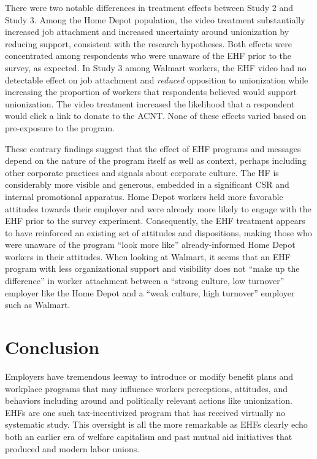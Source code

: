 \documentclass[
  11pt,
  oneside]{article}
\begin{document}
There were two notable differences in treatment effects between Study 2 and Study 3. Among the Home Depot population, the video treatment substantially increased job attachment and increased uncertainty around unionization by reducing support, consistent with the research hypotheses. Both effects were concentrated among respondents who were unaware of the EHF prior to the survey, as expected. In Study 3 among Walmart workers, the EHF video had no detectable effect on job attachment and \emph{reduced} opposition to unionization while increasing the proportion of workers that respondents believed would support unionization. The video treatment increased the likelihood that a respondent would click a link to donate to the ACNT. None of these effects varied based on pre-exposure to the program.

These contrary findings suggest that the effect of EHF programs and messages depend on the nature of the program itself as well as context, perhaps including other corporate practices and signals about corporate culture. The HF is considerably more visible and generous, embedded in a significant CSR and internal promotional apparatus. Home Depot workers held more favorable attitudes towards their employer and were already more likely to engage with the EHF prior to the survey experiment. Consequently, the EHF treatment appears to have reinforced an existing set of attitudes and dispositions, making those who were unaware of the program ``look more like'' already-informed Home Depot workers in their attitudes. When looking at Walmart, it seems that an EHF program with less organizational support and visibility does not ``make up the difference'' in worker attachment between a ``strong culture, low turnover'' employer like the Home Depot and a ``weak culture, high turnover'' employer such as Walmart.

\section{Conclusion}\label{conclusion}

Employers have tremendous leeway to introduce or modify benefit plans and workplace programs that may influence workers perceptions, attitudes, and behaviors including around and politically relevant actions like unionization. EHFs are one such tax-incentivized program that has received virtually no systematic study. This oversight is all the more remarkable as EHFs clearly echo both an earlier era of welfare capitalism and past mutual aid initiatives that produced and modern labor unions.
\end{document}
